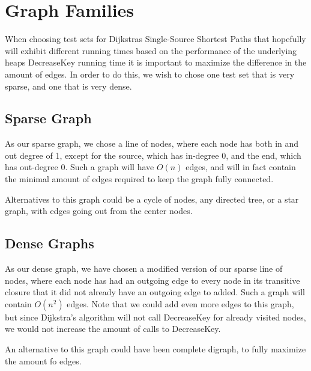 \section{Graph Families}

When choosing test sets for Dijkstras Single-Source Shortest Paths that hopefully will exhibit different running times based on the performance of the underlying heaps DecreaseKey running time it is important to maximize the difference in the amount of edges.
In order to do this, we wish to chose one test set that is very sparse, and one that is very dense.

\subsection{Sparse Graph}

As our sparse graph, we chose a line of nodes, where each node has both in and out degree of 1, except for the source, which has in-degree 0, and the end, which has out-degree 0. Such a graph will have $O(n)$ edges, and will in fact contain the minimal amount of edges required to keep the graph fully connected.

Alternatives to this graph could be a cycle of nodes, any directed tree, or a star graph, with edges going out from the center nodes.

\subsection{Dense Graphs}

As our dense graph, we have chosen a modified version of our sparse line of nodes, where each node has had an outgoing edge to every node in its transitive closure that it did not already have an outgoing edge to added. Such a graph will contain $O(n^2)$ edges. Note that we could add even more edges to this graph, but since Dijkstra's algorithm will not call DecreaseKey for already visited nodes, we would not increase the amount of calls to DecreaseKey.

An alternative to this graph could have been complete digraph, to fully maximize the amount fo edges.

